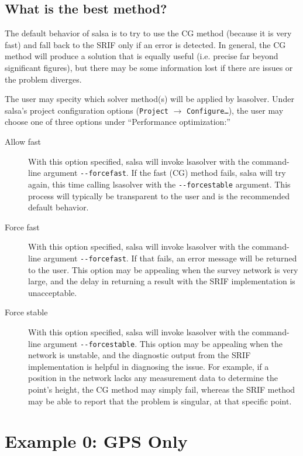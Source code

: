\subsection{What is the best method?}
The default behavior of \textsf{salsa} is to try to use the CG method (because it is very fast)
 and fall back to the SRIF only if an error is detected. In general, the CG method will produce
a solution that is equally useful (i.e. precise far beyond significant figures),
but there may be some information lost if there are issues or the problem
diverges.

The user may specity which solver method(s) will be applied by \textsf{lsasolver}.  Under \textsf{salsa}'s project configuration options (\texttt{Project} $\to$ \texttt{Configure\ldots}), the user may choose one of three options under ``Performance optimization:''
\begin{description}
\item[Allow fast] With this option specified, \textsf{salsa} will invoke \textsf{lsasolver} with the command-line argument \verb+--forcefast+. If the fast (CG) method fails, \textsf{salsa} will try again, this time calling \textsf{lsasolver} with the \verb+--forcestable+ argument.  This process will typically be transparent to the user and is the recommended default behavior.
\item[Force fast] With this option specified, \textsf{salsa} will invoke \textsf{lsasolver} with the command-line argument \verb+--forcefast+.  If that fails, an error message will be returned to the user.  This option may be appealing when the survey network is very large, and the delay in returning a result with the SRIF implementation is unacceptable.
\item[Force stable] With this option specified, \textsf{salsa} will invoke \textsf{lsasolver} with the command-line argument \verb+--forcestable+.  This option may be appealing when the network is unstable, and the diagnostic output from the SRIF implementation is helpful in diagnosing the issue.  For example, if a position in the network lacks any measurement data to determine the point's height, the CG method may simply fail, whereas the SRIF method may be able to report that the problem is singular, at that specific point.
\end{description}

\section{Example 0: GPS Only}


